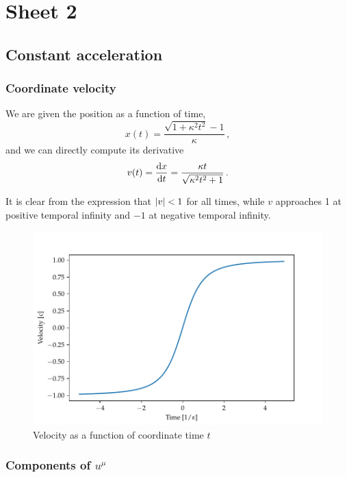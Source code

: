 \documentclass[main.tex]{subfiles}
\begin{document}
\section{Sheet 2}

\subsection{Constant acceleration}

\subsubsection{Coordinate velocity}

We are given the position as a function of time, 
\begin{equation}
  x(t) = \frac{\sqrt{1 + \kappa^2 t^2} -1 }{\kappa }\,,
\end{equation}
%
and we can directly compute its derivative
%
\begin{equation}
  v(t) = \dv{x}{t} =
  \frac{\kappa t}{\sqrt{\kappa^2 t^2  + 1} }\,.
\end{equation}

It is clear from the expression that \(\abs{v} < 1\) for all times, while \(v\) approaches 1 at positive temporal infinity and \(-1\) at negative temporal infinity.

\begin{figure}[h]
    \centering
    \includegraphics[width=\textwidth]{figures/velocity.pdf}
    \caption{Velocity as a function of coordinate time \(t\)}
    \label{fig:velocity-constant-acceleration}
\end{figure}

\subsubsection{Components of \(u^{\mu }\)}
\end{document}
